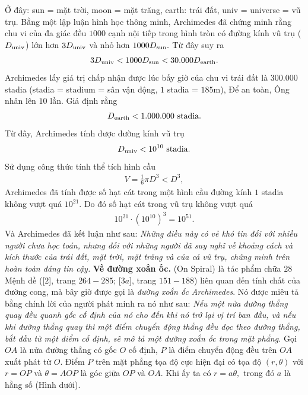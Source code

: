 \begin{multicols}{2}
	Ở đây: sun = mặt trời, moon = mặt trăng, earth: trái đất, univ = universe = vũ trụ.
	\vskip 0.1cm
	Bằng một lập luận hình học thông minh, Archimedes đã chứng minh rằng chu vi của đa giác đều $1000$ cạnh nội tiếp trong hình tròn có đường kính vũ trụ (${D_{{\rm{univ}}}}$) lớn hơn  $3{D_{{\rm{univ}}}}$ và nhỏ hơn $1000{D_{{\rm{sun}}}}{\rm{.}}$  Từ đây suy ra
	\begin{align*}
		3{D_{{\rm{univ}}}} < 1000{D_{{\rm{sun}}}} < 30.000{D_{{\rm{earth}}}}.
	\end{align*}
	Archimedes lấy giá trị chấp nhận được lúc bấy giờ của chu vi trái đất là 300.000 stadia (stadia = stadium = sân vận động, $1$ stadia = $185$m), Để an toàn, Ông nhân lên $10$ lần. Giả định rằng
	\begin{align*}
		{D_{{\rm{earth}}}} < 1.000.000 \text{ stadia.}
	\end{align*}
	Từ đây, Archimedes tính được đường kính vũ trụ 
	\begin{align*}
		{D_{{\rm{univ}}}} < {10^{10}} \text{ stadia.}
	\end{align*}
	Sử dụng công thức tính thể tích hình cầu 
	\begin{align*}
		V = \frac{1}{6}\pi {D^3} < {D^3},
	\end{align*}
	Archimedes đã tính được số hạt cát trong một hình cầu đường kính $1$ stadia không vượt quá $10^21$. Do đó số hạt cát trong vũ trụ không vượt quá 
	\begin{align*}
		{10^{21}} \cdot {\left( {{{10}^{10}}} \right)^3} = {10^{51}}.
	\end{align*}
	Và Archimedes đã kết luận như sau: \textit{Những điều này có vẻ khó tin đối với nhiều người chưa học toán, nhưng đối với những người đã suy nghĩ về khoảng cách và kích thước của trái đất, mặt trời, mặt trăng và của cả vũ trụ, chứng minh trên hoàn toàn đáng tin cậy.}
	\vskip 0.1cm
	\textbf{\color{lichsutoanhoc}Về đường xoắn ốc.} (On Spiral) là tác phẩm chữa $28$ Mệnh đề ([$2$], trang $264-285$; [$3a$], trang $151-188$) liên quan đến tính chất của đường cong, mà bây giờ được gọi là \textit{đường xoắn ốc Archimedes}. Nó được miêu tả bằng chính lời của người phát minh ra nó như sau: \textit{Nếu một nửa đường thẳng quay đều quanh gốc cố định của nó cho đến khi nó trở lại vị trí ban đầu, và nếu khi đường thẳng quay thì một điểm chuyển động thẳng đều dọc theo đường thẳng, bắt đầu từ một điểm cố định, sẽ mô tả một đường xoắn ốc trong mặt phẳng.  }
	\vskip 0.1cm
	Gọi $OA$ là nửa đường thẳng có gốc $O$  cố định, $P$  là điểm chuyển động đều trên $OA$ xuất phát từ $O$.  Điểm $P$  trên mặt phẳng tọa độ cực hiện đại có tọa độ $\left( {r,\theta } \right)$  với $r = OP$  và  $\theta  = AOP$ là góc giữa $OP$  và $OA$.  Khi ấy ta có $r = a\theta ,$  trong đó  $a$ là hằng số (Hình dưới).  

\end{multicols}
